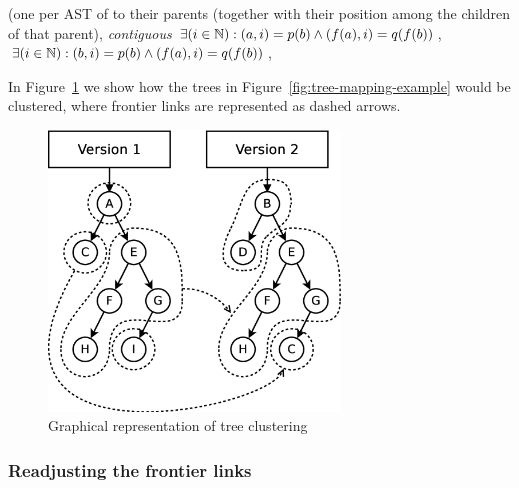 (one per AST of
to their parents (together with their 
position among the children of that parent),
\emph{contiguous}
$\exists(i\in\text{\ensuremath{\mathbb{N}})}:(a,i)=p(b)\land(f(a),i)=q(f(b))$,
$\exists(i\in\text{\ensuremath{\mathbb{N}})}:(b,i)=p(b)\land(f(a),i)=q(f(b))$,

In Figure~\ref{fig:tree-clustering-example} we show how the trees
in Figure~\ref{fig:tree-mapping-example} would be clustered, where frontier 
links
are represented as dashed arrows.

\begin{figure}
\centering
\includegraphics[width=0.69\textwidth]{figures/automatic_beh_inf/diagrams/dia3}
\par

\caption{Graphical representation of tree 
clustering\label{fig:tree-clustering-example}}
\end{figure}



\subsubsection{Readjusting the frontier links}

